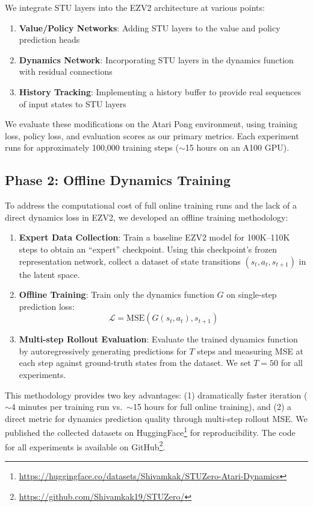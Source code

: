 \documentclass[10pt,twocolumn]{IEEEtran}
\begin{document}
We integrate STU layers into the EZV2 architecture at various points:

\begin{enumerate}
    \item \textbf{Value/Policy Networks}: Adding STU layers to the value and policy prediction heads
    \item \textbf{Dynamics Network}: Incorporating STU layers in the dynamics function with residual connections
    \item \textbf{History Tracking}: Implementing a history buffer to provide real sequences of input states to STU layers
\end{enumerate}

We evaluate these modifications on the Atari Pong environment, using training loss, policy loss, and evaluation scores as our primary metrics. Each experiment runs for approximately 100,000 training steps (${\sim}$15 hours on an A100 GPU).

\subsection{Phase 2: Offline Dynamics Training}
\label{sec:offline}

To address the computational cost of full online training runs and the lack of a direct dynamics loss in EZV2, we developed an offline training methodology:

\begin{enumerate}
    \item \textbf{Expert Data Collection}: Train a baseline EZV2 model for 100K--110K steps to obtain an ``expert'' checkpoint. Using this checkpoint's frozen representation network, collect a dataset of state transitions $(s_t, a_t, s_{t+1})$ in the latent space.
    \item \textbf{Offline Training}: Train only the dynamics function $G$ on single-step prediction loss:
    \begin{equation}
    \mathcal{L} = \text{MSE}(G(s_t, a_t), s_{t+1})
    \end{equation}
    \item \textbf{Multi-step Rollout Evaluation}: Evaluate the trained dynamics function by autoregressively generating predictions for $T$ steps and measuring MSE at each step against ground-truth states from the dataset. We set $T = 50$ for all experiments.
\end{enumerate}

This methodology provides two key advantages: (1) dramatically faster iteration (${\sim}$4 minutes per training run vs.\ ${\sim}$15 hours for full online training), and (2) a direct metric for dynamics prediction quality through multi-step rollout MSE. We published the collected datasets on HuggingFace\footnote{\url{https://huggingface.co/datasets/Shivamkak/STUZero-Atari-Dynamics}} for reproducibility. The code for all experiments is available on GitHub\footnote{\url{https://github.com/Shivamkak19/STUZero/}}.
\end{document}
